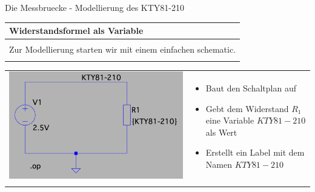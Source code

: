 \begin{frame}[t]{Die Messbruecke - Modellierung des KTY81-210} 
    
    \begin{spacing}{0.9} \begin{tiny}
      \begin{table}[h!]
        \begin{tabular}{p{10cm}}
            \hline
            \textbf{Widerstandsformel als Variable} \\
            \hline \\
            \begin{minipage}{\textwidth}
                Zur Modellierung starten wir mit einem einfachen schematic.
            \end{minipage}
            \\ \\
        \end{tabular}
        \begin{tabular}{p{3cm} p{7cm}}
            \begin{minipage}{.3\textwidth}
                \includegraphics[width=0.8\linewidth]{pictures/kty81_test.png} 
            \end{minipage} 
            &
            \begin{minipage}{.7\textwidth}
                \begin{itemize}
                    \item Baut den Schaltplan auf
                    \item Gebt dem Widerstand $R_1$ eine Variable $KTY81-210$ als Wert
                    \item Erstellt ein Label mit dem Namen $KTY81-210$ 
                \end{itemize}
            \end{minipage} 
            \\\\

\end{tabular}
\end{table}
\end{tiny}
\end{spacing}
\end{frame}
